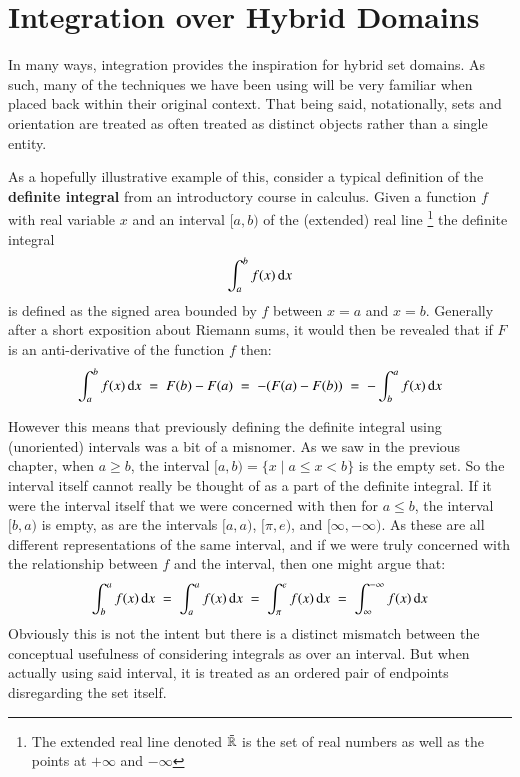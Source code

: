 \chapter{Integration over Hybrid Domains}
\label{chp:Integration}


%
%

In many ways, integration provides the inspiration for hybrid set domains.
As such, many of the techniques we have been using will be very familiar when placed back within their original context.
That being said, notationally, sets and orientation are treated as often treated as distinct objects rather than a single entity.


As a hopefully illustrative example of this, consider a typical definition of the \textbf{definite integral} from an introductory
course in calculus.
Given a function $f$ with real variable $x$ and an interval $[a,b)$ of the (extended) real line
\footnote{ The extended real line denoted $\bar{\mathbb{R}}$ is the set of real numbers as well as the points at 
$+\infty$ and $-\infty$} the definite integral
\begin{equation*}
	\int_a^b f(x) \mathop{}\!\mathrm{d} x
\end{equation*}
is defined as the signed area bounded by $f$ between $x=a$ and $x=b$.
Generally after a short exposition about Riemann sums, it would then be revealed that if $F$ is an anti-derivative of the
 function $f$ then:
\begin{equation*}
	\int_a^b f(x) \mathop{}\!\mathrm{d} x \;=\; F(b)-F(a) \;=\; - (F(a)-F(b)) \;=\; - \int_b^a f(x) \mathop{}\!\mathrm{d} x
\end{equation*}


However this means that previously defining the definite integral using (unoriented) intervals was a bit of a misnomer.
As we saw in the previous chapter, when $a \geq b$, the interval $[a,b) = \{ x \;|\; a \leq x < b \}$ is the empty set.
So the interval itself cannot really be thought of as a part of the definite integral.
If it were the interval itself that we were concerned with then for $a \leq b$, the interval $[b,a)$ is empty,
as are the intervals $[a,a)$, $[\pi, e)$, and $[\infty, -\infty)$.
As these are all different representations of the same interval, and if we were truly concerned with 
the relationship between $f$ and the interval, then one might argue that:
\begin{equation*}
	\int_b^a f(x) \mathop{}\!\mathrm{d} x \;=\; \int_a^a f(x) \mathop{}\!\mathrm{d} x \;=\; \int_\pi^e f(x)\mathop{}\!\mathrm{d} x \;=\; \int_\infty^{-\infty} f(x) \mathop{}\!\mathrm{d} x
\end{equation*}
Obviously this is not the intent but there is a distinct mismatch between the conceptual usefulness of considering
integrals as over an interval.
But when actually using said interval, it is treated as an ordered pair of endpoints disregarding the set itself.


